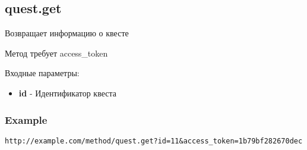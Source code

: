 \subsection{quest.get}
Возвращает информацию о квесте

Метод требует access\_token

Входные параметры:
\begin{itemize}
  \item \textbf{id} - Идентификатор квеста
\end{itemize}

\subsubsection{Example}
\begin{Verbatim}[frame=single]
http://example.com/method/quest.get?id=11&access_token=1b79bf282670dec
\end{Verbatim}